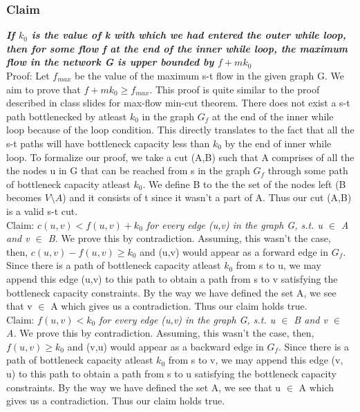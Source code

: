 \documentclass{article}
\begin{document}
\begin{mdframed}
\subsubsection{Claim}
\textbf{\textit{If $k_{0}$ is the value of k with which we had entered the outer while loop, then for some flow f at the end of the inner while loop, the maximum flow in the network G is upper bounded by $f+mk_{0}$}}
\vspace{0.2cm}\\
Proof: Let $f_{max}$ be the value of the maximum s-t flow in the given graph G. We aim to prove that $f+mk_0 \geq f_{max}$. This proof is quite similar to the proof described in class slides for max-flow min-cut theorem. There does not exist a s-t path bottlenecked by atleast $k_{0}$ in the graph $G_{f}$ at the end of the inner while loop because of the loop condition. This directly translates to the fact that all the s-t paths will have bottleneck capacity less than $k_0$ by the end of inner while loop. To formalize our proof, we take a cut (A,B) such that A comprises of all the the nodes u in G that can be reached from s in the graph $G_{f}$ through some path of bottleneck capacity atleast $k_0$. We define B to the the set of the nodes left (B becomes $V \setminus A$) and it consists of t since it wasn't a part of A. Thus our cut (A,B) is a valid s-t cut.
\vspace{0.2cm}\\
Claim: \textit{$c(u,v) < f(u,v) + k_0$ for every edge (u,v) in the graph G, s.t. u $\in$ A and v $\in$ B.} We prove this by contradiction. Assuming, this wasn't the case, then, $c(u,v) - f(u,v) \geq k_0$ and (u,v) would appear as a forward edge in $G_{f}$. Since there is a path of bottleneck capacity atleast $k_{0}$ from s to u, we may append this edge (u,v) to this path to obtain a path from s to v satisfying the bottleneck capacity constraints. By the way we have defined the set A, we see that v $\in$ A which gives us a contradiction. Thus our claim holds true. 
\vspace{0.2cm}\\
Claim: \textit{$f(u,v) < k_0$ for every edge (u,v) in the graph G, s.t. u $\in$ B and v $\in$ A.} We prove this by contradiction. Assuming, this wasn't the case, then, $f(u,v) \geq k_0$ and (v,u) would appear as a backward edge in $G_{f}$. Since there is a path of bottleneck capacity atleast $k_{0}$ from s to v, we may append this edge (v, u) to this path to obtain a path from s to u satisfying the bottleneck capacity constraints. By the way we have defined the set A, we see that u $\in$ A which gives us a contradiction. Thus our claim holds true.


\end{mdframed}
\end{document}
